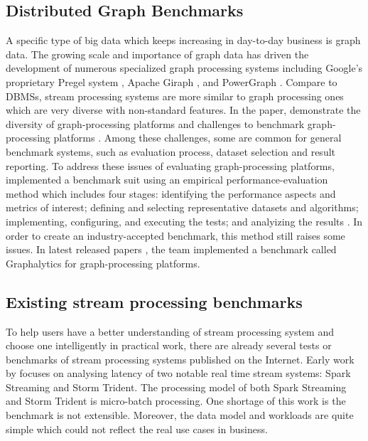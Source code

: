\subsection{ Distributed Graph Benchmarks}

A specific type of big data which keeps increasing in day-to-day business is graph data. The growing scale and importance of graph data has driven the development of numerous specialized graph processing systems including Google's proprietary Pregel system \cite {Pregel}, Apache Giraph  \cite{Giraph}, and PowerGraph \cite{PowerGraph}. Compare to DBMSs, stream processing systems are more similar to graph processing ones which are very diverse with non-standard features. In the paper, \citeauthor{guo2014benchmarking} demonstrate the diversity of graph-processing platforms and challenges to benchmark graph-processing platforms \cite{guo2014benchmarking}. Among these challenges, some are common for general benchmark systems, such as evaluation process, dataset selection and result reporting. To address these issues of evaluating graph-processing platforms, \citeauthor{guo2014well} implemented a benchmark suit using an empirical performance-evaluation method which includes four stages: identifying the performance aspects and metrics of interest; defining and selecting representative datasets and algorithms; implementing, configuring, and executing the tests; and analyizing the results \cite{guo2014well}. In order to create an industry-accepted benchmark, this method still raises some issues. In latest released papers \cite{iosup2014towards, capota2015graphalytics}, the team implemented a benchmark called Graphalytics for graph-processing platforms. 

\subsection{ Existing stream processing benchmarks}

To help users have a better understanding of stream processing system and choose one intelligently in practical work, there are already several tests or benchmarks of stream processing systems published on the Internet. Early work by \citet{cordovaanalysis} focuses on analysing latency of two notable real time stream systems: Spark Streaming and Storm Trident. The processing model of both Spark Streaming and Storm Trident is micro-batch processing. One shortage of this work is the benchmark is not extensible. Moreover, the data model and workloads are quite simple which could not reflect the real use cases in business. 


